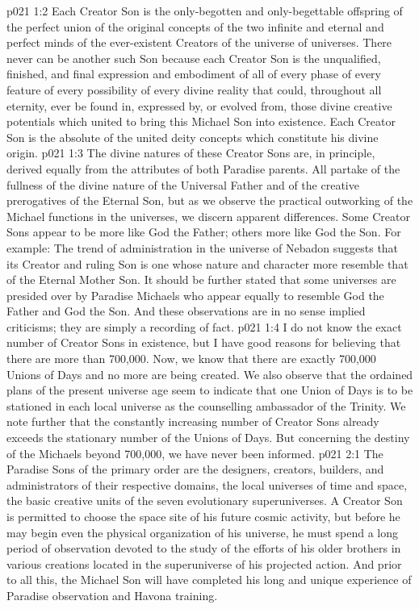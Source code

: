 \vs p021 1:2 Each Creator Son is the only\hyp{}begotten and only\hyp{}begettable offspring of the perfect union of the original concepts of the two infinite and eternal and perfect minds of the ever\hyp{}existent Creators of the universe of universes. There never can be another such Son because each Creator Son is the unqualified, finished, and final expression and embodiment of all of every phase of every feature of every possibility of every divine reality that could, throughout all eternity, ever be found in, expressed by, or evolved from, those divine creative potentials which united to bring this Michael Son into existence. Each Creator Son is the absolute of the united deity concepts which constitute his divine origin.
\vs p021 1:3 The divine natures of these Creator Sons are, in principle, derived equally from the attributes of both Paradise parents. All partake of the fullness of the divine nature of the Universal Father and of the creative prerogatives of the Eternal Son, but as we observe the practical outworking of the Michael functions in the universes, we discern apparent differences. Some Creator Sons appear to be more like God the Father; others more like God the Son. For example: The trend of administration in the universe of Nebadon suggests that its Creator and ruling Son is one whose nature and character more resemble that of the Eternal Mother Son. It should be further stated that some universes are presided over by Paradise Michaels who appear equally to resemble God the Father and God the Son. And these observations are in no sense implied criticisms; they are simply a recording of fact.
\vs p021 1:4 I do not know the exact number of Creator Sons in existence, but I have good reasons for believing that there are more than 700,000. Now, we know that there are exactly 700,000 Unions of Days and no more are being created. We also observe that the ordained plans of the present universe age seem to indicate that one Union of Days is to be stationed in each local universe as the counselling ambassador of the Trinity. We note further that the constantly increasing number of Creator Sons already exceeds the stationary number of the Unions of Days. But concerning the destiny of the Michaels beyond 700,000, we have never been informed.
\vs p021 2:1 The Paradise Sons of the primary order are the designers, creators, builders, and administrators of their respective domains, the local universes of time and space, the basic creative units of the seven evolutionary superuniverses. A Creator Son is permitted to choose the space site of his future cosmic activity, but before he may begin even the physical organization of his universe, he must spend a long period of observation devoted to the study of the efforts of his older brothers in various creations located in the superuniverse of his projected action. And prior to all this, the Michael Son will have completed his long and unique experience of Paradise observation and Havona training.
